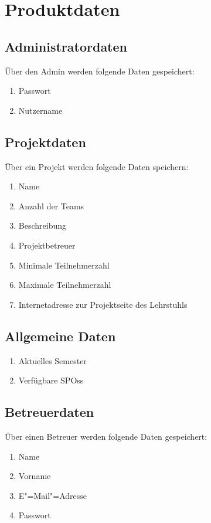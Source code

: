 \documentclass[parskip=full]{scrartcl}
\newcommand{\swtLabel}[1]{\textbf{/#1\arabic*0/}}
\begin{document}
\section{Produktdaten}

\subsection{Administratordaten}
Über den \gls{Admin} werden folgende Daten gespeichert:
\begin{enumerate}[label=\swtLabel{D}] 
	\item Passwort
	\item Nutzername
\end{enumerate}

\subsection{Projektdaten}
Über ein Projekt werden folgende Daten speichern:
\begin{enumerate}[label=\swtLabel{D},resume] 
  \item Name \label{DProjektAnfang}
  \item Anzahl der Teams
  \item Beschreibung
  \item Projektbetreuer
  \item Minimale Teilnehmerzahl
  \item Maximale Teilnehmerzahl
  \item Internetadresse zur Projektseite des Lehrstuhls \label{DProjektEnde}
\end{enumerate}
 
\subsection{Allgemeine Daten}
\begin{enumerate}[label=\swtLabel{D},resume]
  \item Aktuelles Semester
  \item Verfügbare \glspl{SPO}s
\end{enumerate}

\subsection{Betreuerdaten}
Über einen Betreuer werden folgende Daten gespeichert:
\begin{enumerate}[label=\swtLabel{D}, resume] 
	\item Name \label{DbetAnfang}
	\item Vorname
	\item E"=Mail"=Adresse
	\item Passwort \label{DbetEnde}
\end{enumerate}
\end{document}
